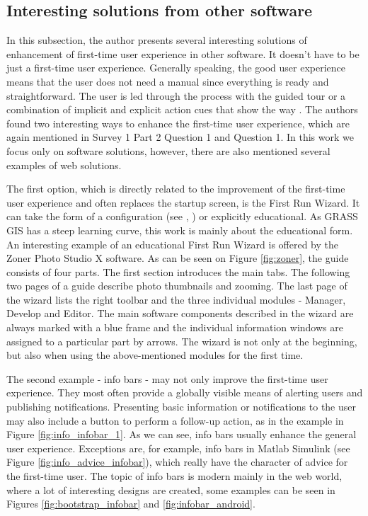 \documentclass[a4paper,10pt,twoside]{article}
\begin{document}
\newpage
\vspace*{-1cm}
\subsection{Interesting solutions from other software}
\label{sec:other_software}

In this subsection, the author presents several interesting solutions of enhancement of first-time user experience in other software. It doesn't have to be just a first-time user experience. Generally speaking, the good user experience means that the user does not need a manual since everything is ready and straightforward. The user is led through the process with the guided tour or a combination of implicit and explicit action cues that show the way \cite{ftue2}. The authors found two interesting ways to enhance the first-time user experience, which are again mentioned in Survey 1 Part 2 Question 1 and Question 1. In this work we focus only on software solutions, however, there are also mentioned several examples of web solutions.

The first option, which is directly related to the improvement of the first-time user experience and often replaces the startup screen, is the First Run Wizard. It can take the form of a configuration (see \cite{lansweeper}, \cite{jetbrains}) or explicitly educational. As GRASS GIS has a steep learning curve, this work is mainly about the educational form. An interesting example of an educational First Run Wizard is offered by the Zoner Photo Studio X software. As can be seen on Figure \ref{fig:zoner}, the guide consists of four parts. The first section introduces the main tabs. The following two pages of a guide describe photo thumbnails and zooming. The last page of the wizard lists the right toolbar and the three individual modules - Manager, Develop and Editor. The main software components described in the wizard are always marked with a blue frame and the individual information windows are assigned to a particular part by arrows. The wizard is not only at the beginning, but also when using the above-mentioned modules for the first time.

The second example - info bars - may not only improve the first-time user experience. They most often provide a globally visible means of alerting users and publishing notifications. Presenting basic information or notifications to the user may also include a button to perform a follow-up action, as in the example in Figure \ref{fig:info_infobar_1}. As we can see, info bars usually enhance  the general user experience. Exceptions are, for example, info bars in Matlab Simulink (see Figure \ref{fig:info_advice_infobar}), which really have the character of advice for the first-time user. The topic of info bars is modern mainly in the web world, where a lot of interesting designs are created, some examples can be seen in Figures \ref{fig:bootstrap_infobar} and \ref{fig:infobar_android}. 
\end{document}
